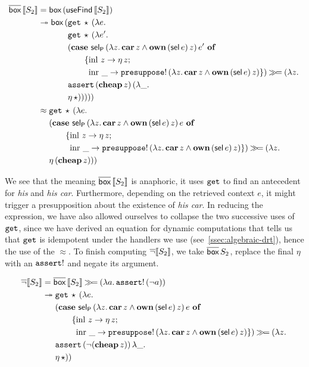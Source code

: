 \begin{align*}
  \overline{\textsf{box}}\,\llbracket S_2 \rrbracket
  &= \textsf{box}\,(\textsf{useFind}\,\llbracket S_2 \rrbracket) \\
  &\twoheadrightarrow \textsf{box}\,(\begin{aligned}[t]
     &\mathtt{get}\,\star\,(\lambda e.\,  \\
     &\mathtt{get}\,\star\,(\lambda e'.\,  \\
     &(\text{\textbf{case} $\textsf{sel}_{\textsf{P}}\,(\lambda z.\, \textbf{car}\,z \land \textbf{own}\,(\textsf{sel}\,e)\,z)\,e'$ \textbf{of}} \\ &\qquad \{\operatorname{inl}\,z \to \eta\,z; \\ &\qquad \ \operatorname{inr}\,\_ \to \mathtt{presuppose}!\,(\lambda z.\, \textbf{car}\,z \land \textbf{own}\,(\textsf{sel}\,e)\,z) \}) \mathbin{\gg\!=} (\lambda z.\,  \\
     &\mathtt{assert}\,(\textbf{cheap}\,z)\,(\lambda \_.\,  \\
     &\eta\,\star)))))
     \end{aligned} \\
  &\approx \begin{aligned}[t]
     &\mathtt{get}\,\star\,(\lambda e.\,  \\
     &(\text{\textbf{case} $\textsf{sel}_{\textsf{P}}\,(\lambda z.\, \textbf{car}\,z \land \textbf{own}\,(\textsf{sel}\,e)\,z)\,e$ \textbf{of}} \\ &\qquad \{\operatorname{inl}\,z \to \eta\,z; \\ &\qquad \ \operatorname{inr}\,\_ \to \mathtt{presuppose}!\,(\lambda z.\, \textbf{car}\,z \land \textbf{own}\,(\textsf{sel}\,e)\,z) \}) \mathbin{\gg\!=} (\lambda z.\,  \\
     &\eta\,(\textbf{cheap}\,z)))
     \end{aligned}
\end{align*}

We see that the meaning $\overline{\textsf{box}}\,\llbracket S_2 \rrbracket$ is anaphoric, it uses
$\mathtt{get}$ to find an antecedent for \emph{his} and \emph{his
  car}. Furthermore, depending on the retrieved context $e$, it might
trigger a presupposition about the existence of \emph{his car}. In reducing
the expression, we have also allowed ourselves to collapse the two
successive uses of $\mathtt{get}$, since we have derived an equation for
dynamic computations that tells us that $\mathtt{get}$ is idempotent under the
handlers we use (see~\ref{ssec:algebraic-drt}), hence the use of the
$\approx$. To finish computing $\mathop{\overline{\lnot}} \llbracket S_2 \rrbracket$, we take
$\overline{\textsf{box}}\,S_2$, replace the final $\eta$ with an $\mathtt{assert}!$ and
negate its argument.

\begin{align*}
  \mathop{\overline{\lnot}} \llbracket S_2 \rrbracket
  &= \overline{\textsf{box}}\,\llbracket S_2 \rrbracket \mathbin{\gg\!=} (\lambda a.\, \mathtt{assert}!\,(\lnot a)) \\
  &\twoheadrightarrow \begin{aligned}[t]
    &\mathtt{get}\,\star\,(\lambda e.\,  \\
    &(\text{\textbf{case} $\textsf{sel}_{\textsf{P}}\,(\lambda z.\, \textbf{car}\,z \land \textbf{own}\,(\textsf{sel}\,e)\,z)\,e$ \textbf{of}} \\ &\qquad \{\operatorname{inl}\,z \to \eta\,z; \\ &\qquad \ \operatorname{inr}\,\_ \to \mathtt{presuppose}!\,(\lambda z.\, \textbf{car}\,z \land \textbf{own}\,(\textsf{sel}\,e)\,z) \}) \mathbin{\gg\!=} (\lambda z.\,  \\
    &\mathtt{assert}\,(\lnot (\textbf{cheap}\,z))\,\lambda \_.\,  \\
    &\eta\,\star))
    \end{aligned}
\end{align*}

